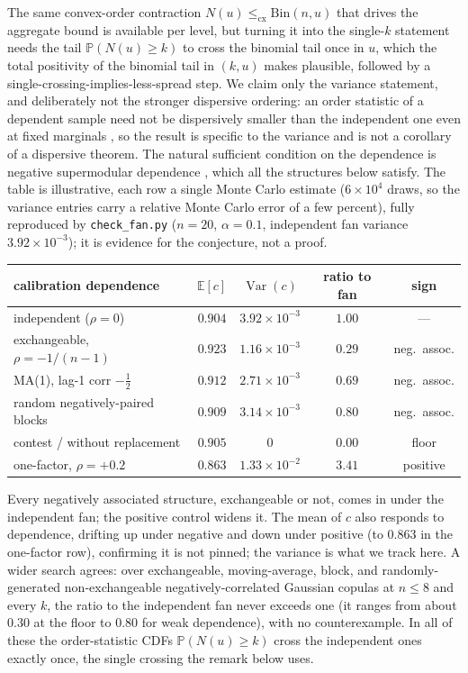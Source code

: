\documentclass[11pt]{article}
\begin{document}
The same convex-order contraction $N(u)\le_{\mathrm{cx}}\mathrm{Bin}(n,u)$ that drives the aggregate
bound is available per level, but turning it into the single-$k$ statement needs the tail
$\mathbb P(N(u)\ge k)$ to cross the binomial tail once in $u$, which the total positivity of the
binomial tail in $(k,u)$ \citep{karlin1968} makes plausible, followed by a
single-crossing-implies-less-spread step. We claim only the variance statement, and deliberately not
the stronger dispersive ordering: an order statistic of a dependent sample need not be dispersively
smaller than the independent one even at fixed marginals \citep{panja2022}, so the result is specific
to the variance and is not a corollary of a dispersive theorem. The natural sufficient condition on
the dependence is negative supermodular dependence \citep{christofides2004}, which all the structures
below satisfy. The table is illustrative, each row a single Monte Carlo estimate ($6\times10^4$ draws,
so the variance entries carry a relative Monte Carlo error of a few percent), fully reproduced by
\texttt{check\_fan.py} ($n=20$, $\alpha=0.1$, independent fan variance $3.92\times10^{-3}$); it is
evidence for the conjecture, not a proof.

\begin{center}
\begin{tabular}{lcccc}
\hline
calibration dependence & $\mathbb E[c]$ & $\operatorname{Var}(c)$ & ratio to fan & sign \\
\hline
independent ($\rho=0$)                 & $0.904$ & $3.92\times10^{-3}$ & $1.00$ & --- \\
exchangeable, $\rho=-1/(n-1)$          & $0.923$ & $1.16\times10^{-3}$ & $0.29$ & neg.\ assoc. \\
MA(1), lag-1 corr $-\tfrac12$          & $0.912$ & $2.71\times10^{-3}$ & $0.69$ & neg.\ assoc. \\
random negatively-paired blocks        & $0.909$ & $3.14\times10^{-3}$ & $0.80$ & neg.\ assoc. \\
contest / without replacement          & $0.905$ & $0$                  & $0.00$ & floor \\
one-factor, $\rho=+0.2$                & $0.863$ & $1.33\times10^{-2}$ & $3.41$ & positive \\
\hline
\end{tabular}
\end{center}

Every negatively associated structure, exchangeable or not, comes in under the independent fan; the
positive control widens it. The mean of $c$ also responds to dependence, drifting up under negative
and down under positive (to $0.863$ in the one-factor row), confirming it is not pinned; the variance
is what we track here. A wider search agrees:
over exchangeable, moving-average, block, and randomly-generated non-exchangeable negatively-correlated
Gaussian copulas at $n\le 8$ and every $k$, the ratio to the independent fan never exceeds one
(it ranges from about $0.30$ at the floor to $0.80$ for weak dependence), with no counterexample. In all
of these the order-statistic CDFs $\mathbb P(N(u)\ge k)$ cross the independent ones exactly once, the
single crossing the remark below uses.
\end{document}
